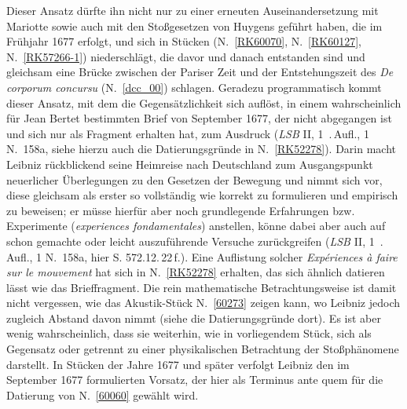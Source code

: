 \begin{ledgroup}
Dieser Ansatz dürfte ihn nicht nur zu einer erneuten Auseinandersetzung mit Mariotte\protect{} sowie auch mit den Stoßgesetzen von Huygens\protect{} geführt haben, die im Frühjahr 1677 erfolgt, und sich in Stücken (N.~\ref{RK60070}, N.~\ref{RK60127}, N.~\ref{RK57266-1}) niederschlägt, die davor und danach entstanden sind und gleichsam eine Brücke zwischen der Pariser Zeit und der Entstehungszeit des \textit{De corporum concursu} (N.~\ref{dcc_00}) schlagen.
Geradezu programmatisch kommt dieser Ansatz, mit dem die Gegensätzlichkeit sich auflöst, in einem wahrscheinlich für Jean Bertet\protect{} bestimmten \cite{02047}Brief von September 1677, der nicht abgegangen ist und sich nur als Fragment erhalten hat, zum Ausdruck (\textit{LSB} II, 1\ .\,Aufl.\rbrack, 1 N.~158a, siehe hierzu auch die Datierungsgründe in N.~\ref{RK52278}).
Darin macht Leibniz rückblickend seine Heimreise nach Deutschland zum Ausgangspunkt neuerlicher Überlegungen zu den Gesetzen der Bewegung und nimmt sich vor, diese gleichsam als erster so vollständig wie korrekt zu formulieren und empirisch zu beweisen; er müsse hierfür aber noch grundlegende Erfahrungen bzw. Experimente (\textit{experiences fondamentales}) anstellen, könne dabei aber auch auf schon gemachte oder leicht auszuführende Versuche zurückgreifen (\cite{02047}\textit{LSB} II, 1\ .\,Aufl.\rbrack, 1 N.~158a, hier S. 572.12.\,22\,f.). Eine Auflistung solcher \textit{Expériences à faire sur le mouvement} hat sich in N.~\ref{RK52278} erhalten, das sich ähnlich datieren lässt wie das Brieffragment. Die rein mathematische Betrachtungsweise ist damit nicht vergessen, wie das Akustik-Stück N.~\ref{60273} zeigen kann, wo Leibniz jedoch zugleich Abstand davon nimmt (siehe die Datierungsgründe dort). Es ist aber wenig wahrscheinlich, dass sie weiterhin, wie in vorliegendem Stück, sich als Gegensatz oder getrennt zu einer physikalischen Betrachtung der Stoßphänomene darstellt. In Stücken der Jahre 1677 und später verfolgt Leibniz den im September 1677 formulierten Vorsatz, der hier als Terminus ante quem für die Datierung von N.~\ref{60060} gewählt wird.
\pend 
\end{ledgroup}
%
\frenchspacing
\vspace{8mm}
\pstart%
\normalsize%
\noindent%
